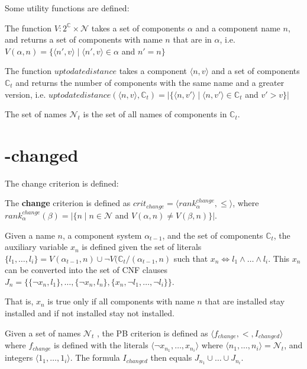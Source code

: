 Some utility functions are defined:

\begin{defs}
The function $V: 2^{\mathbb{C}} \times \mathcal{N}$ takes a set of components $\alpha$ and a component name $n$, and returns a set of components with name $n$ that are in $\alpha$,
i.e. $V(\alpha,n) = \{\langle n',v \rangle \mid \langle n',v \rangle \in \alpha $ and $ n' = n \}$
\end{defs}

\begin{defs}
The function $uptodatedistance$ takes a component $\langle n, v \rangle$ and a set of components $\mathbb{C}_t$ and returns the number of components with the same name and a greater version,
i.e. $uptodatedistance(\langle n, v \rangle,\mathbb{C}_t) = |\{\langle n, v' \rangle \mid \langle n, v' \rangle \in \mathbb{C}_t $ and $ v' > v \}|$
\end{defs}

\begin{defs}
The set of names $\mathcal{N}_t$ is the set of all names of components in $\mathbb{C}_t$.
\end{defs}

\section{-changed}

The change criterion is defined:
\begin{defs}
	The \textbf{change} criterion is defined as $crit_{change} = \langle rank^{change}_{\alpha}, \leq \rangle$,
	where $rank^{change}_{\alpha}(\beta) = |\{n \mid n \in \mathcal{N}$ and $V(\alpha,n) \neq V(\beta,n) \}|$.
\end{defs}

\begin{defs}
Given a name $n$, a component system $\alpha_{t-1}$, and the set of components $\mathbb{C}_t$,
the auxiliary variable $x_n$ is defined given the set of literals $\{l_1,\ldots,l_i\} = V(\alpha_{t-1},n) \cup \neg V(\mathbb{C}_t / (\alpha_{t-1} ,n)$ 
such that $x_n \Leftrightarrow l_1 \wedge \ldots \wedge l_i$.
This $x_n$ can be converted into the set of CNF clauses $J_n = \{ \{\neg x_n,l_1\},\ldots, \{\neg x_n,l_n\}, \{x_n, \neg l_1,\ldots,\neg l_i\}\}$.
\end{defs}
That is, $x_n$ is true only if all components with name $n$ that are installed stay installed and if not installed stay not installed.

\begin{defs}
Given a set of names $\mathcal{N}_t$ , the PB criterion is defined as $\langle f_{change}, <, I_{changed} \rangle$ where 
$f_{change}$ is defined with the literals $\langle \neg x_{n_1},\ldots, x_{n_i}\rangle$ where $\langle n_1,\ldots, n_i \rangle = \mathcal{N}_t$, and integers $\langle 1_1,\ldots,1_i\rangle$.
The formula $I_{changed}$ then equals $J_{n_1} \cup \ldots \cup J_{n_i}$.
\end{defs}

